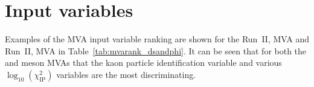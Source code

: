 \section{Input variables}
\label{sec:App_MVA_input}

Examples of the MVA input variable ranking are shown for the Run~II, \decay{\phiz}{\Kp\Km} MVA and Run~II, \decay{\Dsp}{\Kp\Km\pip} MVA in Table~\ref{tab:mvarank_dsandphi}. It can be seen that for both the \Dsp and \phiz meson MVAs that the kaon particle identification variable and various $\log_{10}(\chi^{2}_{\text{IP}})$ variables are the most discriminating.

\begin{table}[h]
\centering
{}
\end{table}
